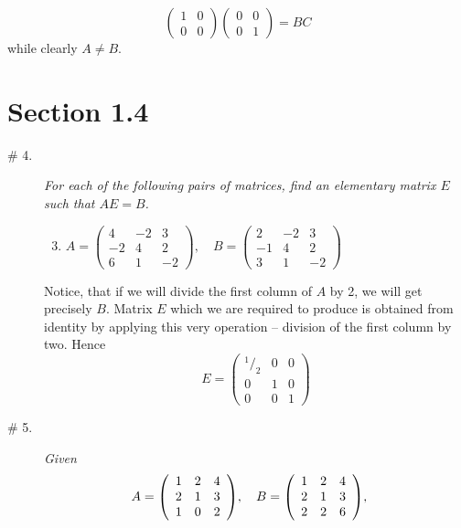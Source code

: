 \documentclass[8pt]{article} %
\begin{document}
\begin{description}
{\[	\begin{pmatrix}1&0\\0&0\end{pmatrix}\begin{pmatrix}0&0\\0&1\end{pmatrix}=BC\]
	while clearly $A\neq B$.
	}
\end{description}
	\section{Section 1.4}
	\begin{description}
	\item[\# 4.]{\textit{For each of the following pairs of matrices, find an elementary matrix $E$ such that $AE=B$.}
		\begin{enumerate}[label=(\alph*)]
			\setcounter{enumi}{2}
		\item $A=\left(\begin{array}{rrr}4&-2&3\\-2&4&2\\6&1&-2\end{array}\right),
				\quad B=\left(\begin{array}{rrr}2&-2&3\\-1&4&2\\3&1&-2\end{array}\right)$
		\end{enumerate}
		Notice, that if we will divide the first column of $A$ by 2, we will get precisely $B$. Matrix $E$ which we are required to produce
		is obtained from identity by applying this very operation -- division of the first column by two.
		Hence \[E=\left(\begin{array}{rrr}^1/_2&0&0\\0&1&0\\0&0&1\end{array}\right)\]
		}
	\item[\# 5.]{
		\newenvironment{mymat}{\left(\begin{array}{rrr}}{\end{array}\right)}
		{\it Given
		\[A=\begin{mymat}1&2&4\\2&1&3\\1&0&2\end{mymat},\quad B=\begin{mymat}1&2&4\\2&1&3\\2&2&6\end{mymat},\quad 
\]}}
\end{description}
\end{document}
